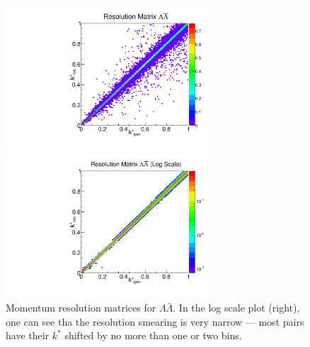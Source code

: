 \begin{figure}[h]
\begin{minipage}{18pc}
\includegraphics[width=18pc]{Figures/2016-07-19-ResMatrixLambdaAntiLambda.pdf}
\end{minipage}\hspace{2pc}
\begin{minipage}{18pc}
\includegraphics[width=18pc]{Figures/2016-07-19-ResMatrixLambdaAntiLambdaLog.pdf}
\end{minipage} 
\caption[Momentum resolution matrices -- $\Lambda\bar{\Lambda}$]{\label{fig:MomResLA} Momentum resolution matrices for $\Lambda\bar{\Lambda}$. In the log scale plot (right), one can see tha the resolution smearing is very narrow --- most pairs have their $k^*$ shifted by no more than one or two bins.}
\end{figure}


